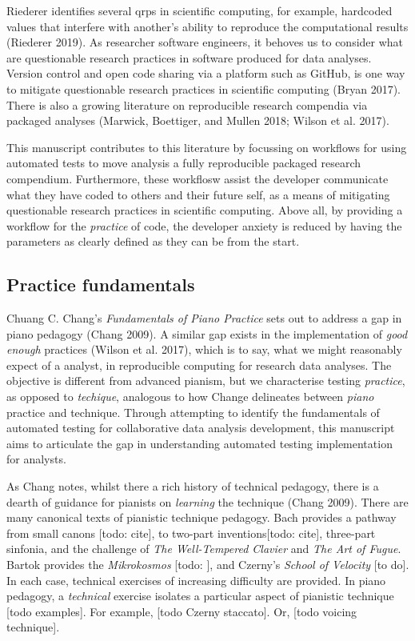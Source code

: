 \documentclass[
]{article}
\begin{document}
Riederer identifies several qrps in scientific computing, for example,
hardcoded values that interfere with another's ability to reproduce the
computational results (Riederer 2019). As researcher software engineers,
it behoves us to consider what are questionable research practices in
software produced for data analyses. Version control and open code
sharing via a platform such as GitHub, is one way to mitigate
questionable research practices in scientific computing (Bryan 2017).
There is also a growing literature on reproducible research compendia
via packaged analyses (Marwick, Boettiger, and Mullen 2018; Wilson et
al. 2017).

This manuscript contributes to this literature by focussing on workflows
for using automated tests to move analysis a fully reproducible packaged
research compendium. Furthermore, these workflosw assist the developer
communicate what they have coded to others and their future self, as a
means of mitigating questionable research practices in scientific
computing. Above all, by providing a workflow for the \emph{practice} of
code, the developer anxiety is reduced by having the parameters as
clearly defined as they can be from the start.

\hypertarget{practice-fundamentals}{%
\subsection{Practice fundamentals}\label{practice-fundamentals}}

Chuang C. Chang's \emph{Fundamentals of Piano Practice} sets out to
address a gap in piano pedagogy (Chang 2009). A similar gap exists in
the implementation of \emph{good enough} practices (Wilson et al. 2017),
which is to say, what we might reasonably expect of a analyst, in
reproducible computing for research data analyses. The objective is
different from advanced pianism, but we characterise testing
\emph{practice}, as opposed to \emph{techique}, analogous to how Change
delineates between \emph{piano} practice and technique. Through
attempting to identify the fundamentals of automated testing for
collaborative data analysis development, this manuscript aims to
articulate the gap in understanding automated testing implementation for
analysts.

As Chang notes, whilst there a rich history of technical pedagogy, there
is a dearth of guidance for pianists on \emph{learning} the technique
(Chang 2009). There are many canonical texts of pianistic technique
pedagogy. Bach provides a pathway from small canons {[}todo: cite{]}, to
two-part inventions{[}todo: cite{]}, three-part sinfonia, and the
challenge of \emph{The Well-Tempered Clavier} and \emph{The Art of
Fugue}. Bartok provides the \emph{Mikrokosmos} {[}todo: {]}, and
Czerny's \emph{School of Velocity} {[}to do{]}. In each case, technical
exercises of increasing difficulty are provided. In piano pedagogy, a
\emph{technical} exercise isolates a particular aspect of pianistic
technique {[}todo examples{]}. For example, {[}todo Czerny staccato{]}.
Or, {[}todo voicing technique{]}.
\end{document}
